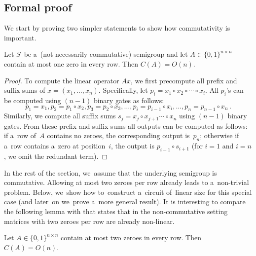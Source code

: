 \documentclass{toc}
\begin{document}
\subsection{Formal proof}
We start by proving two simpler statements to show how commutativity is
important.

\begin{lemma}\label{lemma:easy}
Let $S$~be a~(not necessarily commutative) semigroup and let
$A \in \{0,1\}^{n \times n}$ contain at most
one zero in every row. Then
$C(A) = O(n)$.
\end{lemma}

\begin{proof}
To compute the linear operator $Ax$, we first
precompute all prefix and suffix sums of $x=(x_1, \dotsc, x_n)$.
Specifically, let $p_i=x_1 \circ x_2 \circ \dotsb \circ x_i$. All $p_i$'s can be
computed using $(n-1)$ binary gates as follows:
\[
p_1=x_1, p_2=p_1 \circ x_2, p_3=p_2 \circ x_3, \dotsc, p_i=p_{i-1} \circ x_i, \dotsc, p_n=p_{n-1}\circ x_n\,.
\]
Similarly, we compute all suffix sums
$s_j=x_j \circ x_{j+1} \dotsb \circ x_n$ using
$(n-1)$ binary gates. From these prefix and suffix sums
all outputs can be
computed as follows: if a~row of~$A$ contains no zeroes,
the corresponding
output is~$p_n$; otherwise if a~row contains a~zero at position~$i$, the
output is $p_{i-1} \circ s_{i+1}$ (for $i=1$ and $i=n$, we omit the redundant
term).
\end{proof}

In the rest of the section, we~assume that the
underlying semigroup is
commutative. Allowing at most two zeroes per row already leads to a~non-trivial
problem.
Below, we~show how to~construct a~circuit of~linear size for
this special case (and later~on we~prove a~more general result).
It is interesting to compare the following lemma
with  that states that in the
non-commutative setting matrices with two zeroes per row are already
%
%
non-linear.
%
%
%
%

\begin{lemma} \label{lem:at_most_2}
Let $A \in \{0,1\}^{n \times n}$ contain at most two zeroes in every row. Then
$C(A) = O(n)$.
\end{lemma}
\end{document}
